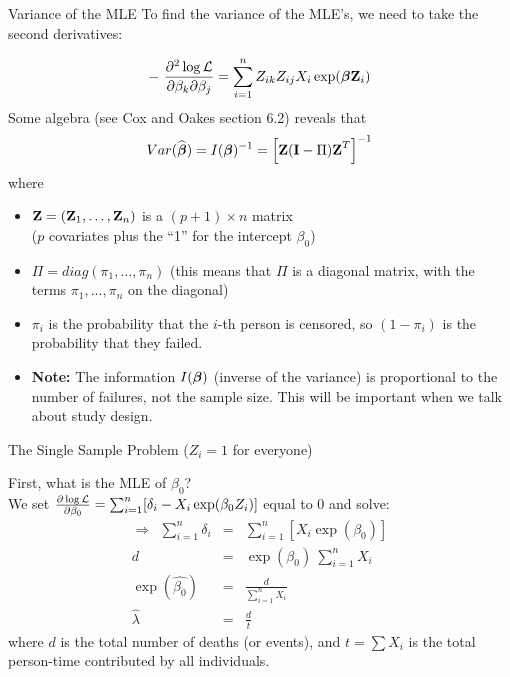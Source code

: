 \documentclass[envcountsect, 10pt, portrait, palatino]{beamer}
\newcommand{\bfbeta}{{\mbox{\boldmath$\beta$}}}
\newcommand{\bfZ}{{\mbox{{\bf Z}}}}
\newcommand{\bfI}{\mathbf{I}}
\begin{document}
\begin{frame}{Variance of the MLE}
To find the variance of the MLE's, we need to take the
second derivatives:

\[ -~ \frac{\partial^2\log{\cal L}  }{\partial \beta_k \partial \beta_j}
=\sum_{i=1}^{n} Z_{ik}Z_{ij} X_i \exp( \bfbeta \bfZ_i )\]
Some algebra (see Cox and Oakes section 6.2) reveals that
\[ Var(\widehat{\bfbeta}) = I(\bfbeta)^{-1} =
\left[ \bfZ (\bfI-\Pi) \bfZ^T \right ]^{-1} \]
where
\begin{itemize}
\item $\bfZ=(\bfZ_1,\ldots,\bfZ_n)$ is a $(p+1)\times n$ matrix\\
($p$ covariates plus the ``1'' for the intercept $\beta_0$)

\item $\Pi=diag(\pi_1,\ldots,\pi_n)$ (this means that $\Pi$ is a
diagonal matrix, with the terms $\pi_1,\ldots,\pi_n$ on the diagonal)

\item $\pi_i$ is the probability that the $i$-{th} person is censored,
so $(1-\pi_i)$ is the probability that they failed.

\item  {\bf Note:} The information $I(\bfbeta)$ (inverse of the
variance) is proportional to the number of failures, not the sample
size.  This will be important when we talk about study design.
\end{itemize}
\end{frame} 
\begin{frame}{The Single Sample Problem ($ Z_i = 1$ for everyone)}

First, what is the MLE of $\beta_0$?
\\[2ex]

We set  $\frac{\partial\log{\cal L}}{\partial
\beta_0}=\sum_{i=1}^{n}  [{\delta_i} - X_i \exp( \beta_0 Z_i )]$
equal to 0 and solve:
\begin{eqnarray*}
\Rightarrow ~~ \sum_{i=1}^{n} {\delta_i} & = &
\sum_{i=1}^{n} [X_i \exp(\beta_0)]\\
d & = & \exp(\beta_0) ~\sum_{i=1}^n X_i\\
\exp(\widehat{\beta_0}) & = & \frac{d}{\sum_{i=1}^n X_i}\\
\hat{\lambda} & = & \frac{d}{t}
\end{eqnarray*}
where $d$ is the total number of deaths (or events), and
$t=\sum X_i$ is the total person-time contributed by all individuals.
\end{frame} 
\end{document}
